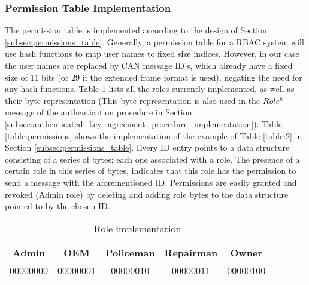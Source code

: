 \subsubsection{Permission Table Implementation}
\label{subsec:permissions_table_implementation}

The permission table is implemented according to the design of Section \ref{subsec:permissions_table}. Generally, a permission table for a RBAC system will use hash functions to map user names to fixed size indices. However, in our case the user names are replaced by CAN message ID's, which already have a fixed size of 11 bits (or 29 if the extended frame format is used), negating the need for any hash functions. Table \ref{table:roles} lists all the roles currently implemented, as well as their byte representation (This byte representation is also used in the $Role^{8}$ message of the authentication procedure in Section \ref{subsec:authenticated_key_agreement_procedure_implementation}). Table \ref{table:permissions} shows the implementation of the example of Table \ref{table:2} in Section \ref{subsec:permissions_table}. Every ID entry points to a data structure consisting of a series of bytes; each one associated with a role. The presence of a certain role in this series of bytes, indicates that this role has the permission to send a message with the aforementioned ID. Permissions are easily granted and revoked (Admin role) by deleting and adding role bytes to the data structure pointed to by the chosen ID. 

\begin{table}[]
	\centering
	\begin{tabular}{|c|c|c|c|c|}
		\hline
		\rowcolor[HTML]{9B9B9B} 
		Admin & OEM & Policeman & Repairman & Owner \\ \hline
		\rowcolor[HTML]{FFFFFF} 
		00000000 & 00000001 & 00000010 & 00000011 & 00000100 \\ \hline
	\end{tabular}
	\label{table:roles}
	\caption{Role implementation}
\end{table}

